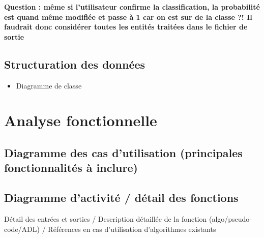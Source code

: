 \textbf{Question : même si l'utilisateur confirme la classification, la probabilité est quand même modifiée et passe à 1 car on est sur de la classe ?! Il faudrait donc considérer toutes les entités traitées dans le fichier de sortie }

\subsection{Structuration des données}

\begin{itemize}
	\item Diagramme de classe
\end{itemize}



\section{Analyse fonctionnelle}

\subsection{Diagramme des cas d'utilisation (principales fonctionnalités à inclure)}

\subsection{Diagramme d'activité / détail des fonctions}

Détail des entrées et sorties / Description détaillée de la fonction (algo/pseudo-code/ADL) / Références en cas d'utilisation d'algorithmes existants\newline

